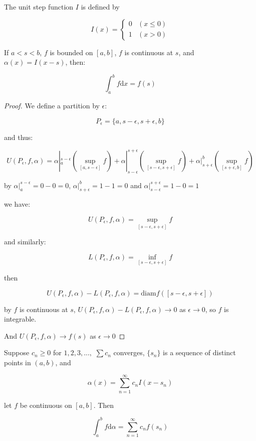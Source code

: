 \begin{thm}
    The unit step function $I$ is defined by 

    \[
        I(x) = \begin{cases}
            0 & (x \le 0) \\
            1 & (x > 0)
        \end{cases}
    \]
\end{thm}

\begin{thm}
    If $a < s <b$, $f$ is bounded on $[a,b]$, $f$ is continuous at $s$,
    and $\alpha(x) = I(x-s)$, then:

    \[
        \int_a^b f \mathrm{d} x = f(s)
    \]
\end{thm}

\begin{proof}
   We define a partition by $\epsilon$:
   
   \[
    P_{\epsilon} = \{ a, s-\epsilon, s+ \epsilon , b \}
   \]

   and thus:

   \[
    U(P_\epsilon, f, \alpha) = \alpha|_{a}^{s-\epsilon}\left( \sup_{[a,s-\epsilon]}  f \right)  + \alpha|_{s-\epsilon}^{s+\epsilon}\left( \sup_{[s-\epsilon, s+\epsilon]}  f \right) + \alpha|_{s+\epsilon}^{b}\left( \sup_{[s+\epsilon, b]}  f \right) 
   \]

   by $\alpha|_{a}^{s-\epsilon} = 0 - 0 = 0$, $\alpha|_{s+\epsilon}^{b} = 1 - 1 = 0$ and $\alpha|_{s-\epsilon}^{s+\epsilon} = 1 - 0 = 1$

   we have:

   \[
    U(P_\epsilon, f, \alpha) =  \sup_{[s-\epsilon, s+\epsilon]}  f 
   \]

   and similarly:


   \[
    L(P_\epsilon, f, \alpha) =  \inf_{[s-\epsilon, s+\epsilon]}  f 
   \]

   then

   \[
   U(P_\epsilon, f, \alpha)  - L(P_\epsilon, f, \alpha) = \mathrm{diam} f([s-\epsilon, s+\epsilon]) 
   \]

   by $f$ is continuous at $s$,  $U(P_\epsilon, f, \alpha)  - L(P_\epsilon, f, \alpha) \to 0$ as $\epsilon \to 0$, so $f$ is integrable.


   And $U(P_{\epsilon}, f, \alpha) \to f(s)$ as $\epsilon \to 0$
\end{proof}

\begin{thm}
    Suppose $c_n \ge 0$ for $1,2,3,...,$ $\sum c_n$ converges, $\{ s_n \}$
    is a sequence of distinct points in $(a,b)$, and

    \[
        \alpha(x) = \sum_{n=1}^{\infty}c_nI(x-s_n)
    \]

    let $f$ be continuous on $[a,b]$. Then

    \[
        \int_a^b f \mathrm{d} \alpha = \sum_{n=1}^{\infty} c_n f(s_n)
    \]
\end{thm}

